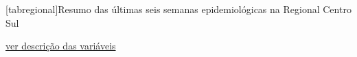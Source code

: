 \documentclass[10pt]{article} %
\begin{document}

[tabregional]{Resumo das últimas seis semanas epidemiológicas na Regional Centro Sul }\begin{center}




\end{center}\small{\hyperlink{vartab}{ver descrição das variáveis}}
\end{document}
